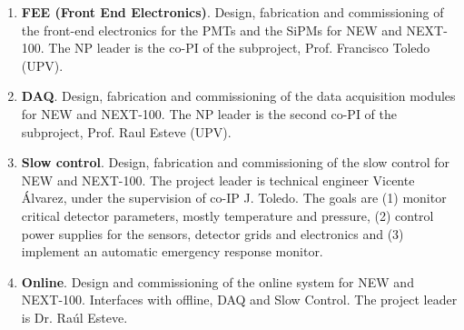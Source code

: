 \begin{enumerate}

\item {\bf FEE (Front End Electronics)}. Design, fabrication and commissioning of the front-end electronics for the PMTs and the SiPMs for NEW and NEXT-100. The NP leader is the co-PI of the subproject, Prof. Francisco Toledo (UPV).
 
\item {\bf DAQ}. Design, fabrication and commissioning of the data acquisition modules for NEW and NEXT-100. The NP leader is the second co-PI of the subproject, Prof. Raul Esteve (UPV).

\item {\bf Slow control}. Design, fabrication and commissioning of the slow control for NEW and NEXT-100. The project leader is technical engineer Vicente Álvarez, under the supervision of co-IP J. Toledo. The goals are (1) monitor critical detector parameters, mostly temperature and pressure, (2) control power supplies for the sensors, detector grids and electronics and (3) implement an automatic emergency response monitor.

\item {\bf Online}. Design and commissioning of the online system for NEW and NEXT-100. Interfaces with offline, DAQ and Slow Control. The project leader is Dr. Raúl Esteve. 

\end{enumerate}